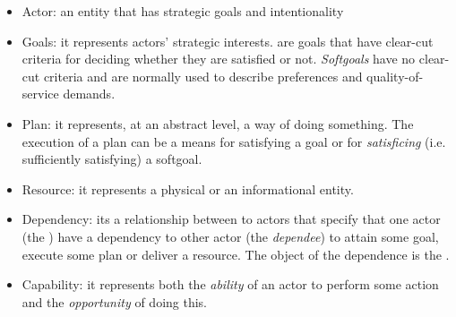 \begin{itemize}
    \item Actor: an entity that has strategic goals and intentionality
    \item Goals: it represents actors’ strategic interests.  are goals that have clear-cut criteria for deciding whether they are satisfied or not. \textit{Softgoals} have no clear-cut criteria and are normally used to describe preferences and quality-of-service demands.

    \item Plan: it represents, at an abstract level, a way of doing something. The execution of a plan can be a means for satisfying a goal or for \textit{satisficing} (i.e. sufficiently satisfying) a softgoal.

    \item Resource: it represents a physical or an informational entity.

    \item Dependency: its a relationship between to actors that specify that one actor (the ) have a dependency to other actor (the \textit{dependee}) to attain some goal, execute some plan or deliver a resource. The object of the dependence is the .

    \item Capability: it represents both the \textit{ability} of an actor to perform some action and the \textit{opportunity} of doing this.

\end{itemize}

